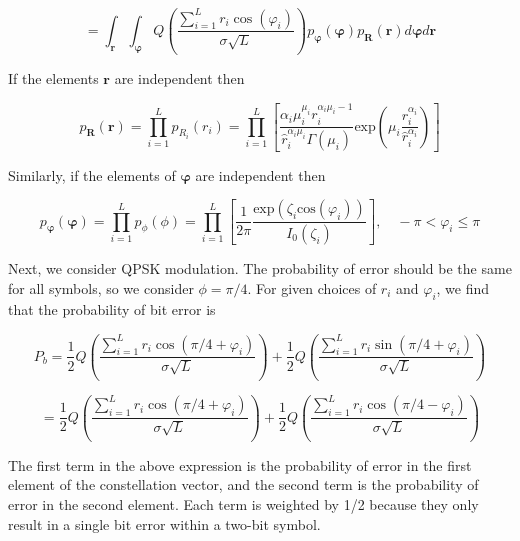 \documentclass[fleqn]{article}
\begin{document}
\begin{enumerate}
		\begin{equation*}
			= \int_{\mathbf{r}}{\int_{\boldsymbol{\varphi}}{Q\left(\frac{\sum_{i=1}^{L}{r_i\cos(\varphi_i)}}{\sigma\sqrt{L}}\right)p_{\boldsymbol{\varphi}}(\boldsymbol{\varphi})p_{\mathbf{R}}(\mathbf{r})d\boldsymbol{\varphi}}d\mathbf{r}}
		\end{equation*}
		
		If the elements $\mathbf{r}$ are independent then
		
		\begin{equation*}
			p_\mathbf{R}(\mathbf{r}) = \prod_{i=1}^{L}{p_{R_i}(r_i)} = \prod_{i=1}^{L}\left[\frac{\alpha_i\mu_i^{\mu_i}r_i^{\alpha_i\mu_i-1}}{\hat{r}_i^{\alpha_i\mu_i}\Gamma(\mu_i)}\text{exp}\left(\mu_i\frac{r_i^{\alpha_i}}{\hat{r}_i^{\alpha_i}}\right)\right]
		\end{equation*}
		
		Similarly, if the elements of $\boldsymbol{\varphi}$ are independent then
		
		\begin{equation*}
			p_{\boldsymbol{\varphi}}(\boldsymbol{\varphi}) = \prod_{i=1}^{L}{p_{\phi}(\phi)} = \prod_{i=1}^{L}\left[\frac{1}{2\pi}\frac{\text{exp}(\zeta_i\text{cos}(\varphi_i))}{I_0(\zeta_i)}\right], \quad -\pi < \varphi_i \leq \pi
		\end{equation*}
		
		Next, we consider QPSK modulation. The probability of error should be the same for all symbols, so we consider $\phi = \pi/4$. For given choices of $r_i$ and $\varphi_i$, we find that the probability of bit error is
		
		\begin{equation*}
			P_b = \frac{1}{2}Q\left(\frac{\sum_{i=1}^{L}{r_i\cos(\pi/4 + \varphi_i)}}{\sigma\sqrt{L}}\right) + \frac{1}{2}Q\left(\frac{\sum_{i=1}^{L}{r_i\sin(\pi/4 + \varphi_i)}}{\sigma\sqrt{L}}\right)
		\end{equation*}
		
		\begin{equation*}
			= \frac{1}{2}Q\left(\frac{\sum_{i=1}^{L}{r_i\cos(\pi/4 + \varphi_i)}}{\sigma\sqrt{L}}\right) + \frac{1}{2}Q\left(\frac{\sum_{i=1}^{L}{r_i\cos(\pi/4 - \varphi_i)}}{\sigma\sqrt{L}}\right)
		\end{equation*}
		
		The first term in the above expression is the probability of error in the first element of the constellation vector, and the second term is the probability of error in the second element. Each term is weighted by 1/2 because they only result in a single bit error within a two-bit symbol.
		 

\end{enumerate}
\end{document}
